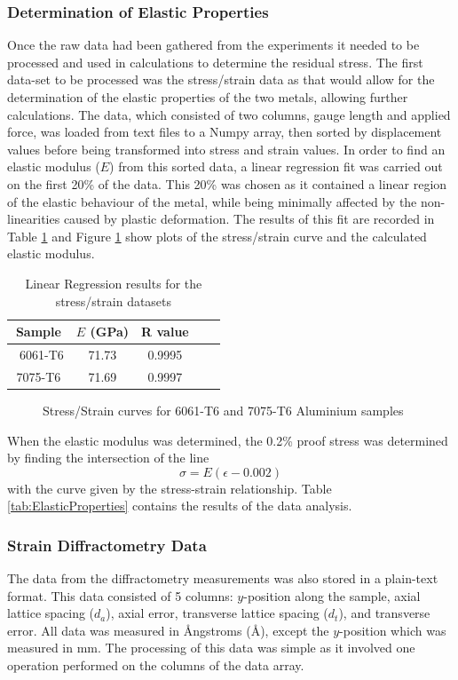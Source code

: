 \documentclass[11pt, oneside]{article}   	%
\begin{document}
\subsubsection{Determination of Elastic Properties}
Once the raw data had been gathered from the experiments it needed to be processed and used in calculations to determine the residual stress.
The first data-set to be processed was the stress/strain data as that would allow for the determination of the elastic properties of the two metals, allowing further calculations. The data, which consisted of two columns, gauge length and applied force, was loaded from text files to a Numpy array, then sorted by displacement values before being transformed into stress and strain values.
In order to find an elastic modulus ($E$) from this sorted data, a linear regression fit was carried out on the first 20\% of the data. This 20\% was chosen as it contained a linear region of the elastic behaviour of the metal, while being minimally affected by the non-linearities caused by plastic deformation. The results of this fit are recorded in Table \ref{tab:LinReg} and Figure \ref{fig:StressStrain} show plots of the stress/strain curve and the calculated elastic modulus.
\begin{table}[h!]
	\centering
	\caption{Linear Regression results for the stress/strain datasets}\label{tab:LinReg}
	\begin{tabular}[c]{c | c c c c}
	Sample & $E$ (\si{\giga\pascal}) & R value\\ \hline\
	6061-T6 & 71.73 & 0.9995 \\
	7075-T6 & 71.69 & 0.9997 \\
	\end{tabular}
\end{table}
\begin{figure}
	\centering
	\caption{Stress/Strain curves for 6061-T6 and 7075-T6 Aluminium samples}\label{fig:StressStrain}
	\scalebox{0.75}{}
	\scalebox{0.75}{}
\end{figure}
\begin{figure}
\centering
\scalebox{0.75}{}
\end{figure}
When the elastic modulus was determined, the 0.2\% proof stress was determined by finding the intersection of the line \[\sigma=E(\epsilon-0.002)\] with the curve given by the stress-strain relationship. Table \ref{tab:ElasticProperties} contains the results of the data analysis.
\subsubsection{Strain Diffractometry Data}
The data from the diffractometry measurements was also stored in a plain-text format. This data consisted of 5 columns: $y$-position along the sample, axial lattice spacing ($d_a$), axial error, transverse lattice spacing ($d_t$), and transverse error. All data was measured in Ångstroms (\si{\angstrom}), except the $y$-position which was measured in \si{\milli\meter}. The processing of this data was simple as it involved one operation performed on the columns of the data array.
\end{document}
